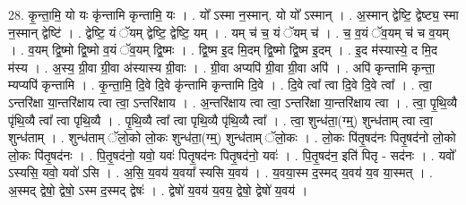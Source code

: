 \documentclass[17pt]{extarticle}
\begin{document}
28. कृ॒न्ता॒मि॒ यो यः कृ॑न्तामि कृन्तामि॒ यः । . यो᳚ ऽस्मा न॒स्मान्. यो यो᳚ ऽस्मान् । . अ॒स्मान् द्वेष्टि॒ द्वेष्ट्य॒ स्मा न॒स्मान् द्वेष्टि॑ । . द्वेष्टि॒ यं ॅयम् द्वेष्टि॒ द्वेष्टि॒ यम् । . यम् च॑ च॒ यं ॅयम् च॑ । . च॒ व॒यं ॅव॒यम् च॑ च व॒यम् । . व॒यम् द्वि॒ष्मो द्वि॒ष्मो व॒यं ॅव॒यम् द्वि॒ष्मः । . द्वि॒ष्म इ॒द मि॒दम् द्वि॒ष्मो द्वि॒ष्म इ॒दम् । . इ॒द म॑स्यास्ये॒ द मि॒द म॑स्य । . अ॒स्य॒ ग्री॒वा ग्री॒वा अ॑स्यास्य ग्री॒वाः । . ग्री॒वा अप्यपि॑ ग्री॒वा ग्री॒वा अपि॑ । . अपि॑ कृन्तामि कृन्ता॒ म्यप्यपि॑ कृन्तामि । . कृ॒न्ता॒मि॒ दि॒वे दि॒वे कृ॑न्तामि कृन्तामि दि॒वे । . दि॒वे त्वा᳚ त्वा दि॒वे दि॒वे त्वा᳚ । . त्वा॒ ऽन्तरि॑क्षा या॒न्तरि॑क्षाय त्वा त्वा॒ ऽन्तरि॑क्षाय । . अ॒न्तरि॑क्षाय त्वा त्वा॒ ऽन्तरि॑क्षा या॒न्तरि॑क्षाय त्वा । . त्वा॒ पृ॒थि॒व्यै पृ॑थि॒व्यै त्वा᳚ त्वा पृथि॒व्यै । . पृ॒थि॒व्यै त्वा᳚ त्वा पृथि॒व्यै पृ॑थि॒व्यै त्वा᳚ । . त्वा॒ शुन्ध॑ता॒(ग्म्॒) शुन्ध॑ताम् त्वा त्वा॒ शुन्ध॑ताम् । . शुन्ध॑ताम् ॅलो॒को लो॒कः शुन्ध॑ता॒(ग्म्॒) शुन्ध॑ताम् ॅलो॒कः । . लो॒कः पि॑तृ॒षद॑नः पितृ॒षद॑नो लो॒को लो॒कः पि॑तृ॒षद॑नः । . पि॒तृ॒षद॑नो॒ यवो॒ यवः॑ पितृ॒षद॑नः पितृ॒षद॑नो॒ यवः॑ । . पि॒तृ॒षद॑न॒ इति॑ पितृ - सद॑नः । . यवो᳚ ऽस्यसि॒ यवो॒ यवो॑ ऽसि । . अ॒सि॒ य॒वय॑ य॒वया᳚ स्यसि य॒वय॑ । . य॒वया॒स्म द॒स्मद् य॒वय॑ य॒व या॒स्मत् । . अ॒स्मद् द्वेषो॒ द्वेषो॒ ऽस्म द॒स्मद् द्वेषः॑ । . द्वेषो॑ य॒वय॑ य॒वय॒ द्वेषो॒ द्वेषो॑ य॒वय॑ । \newline
\end{document}
